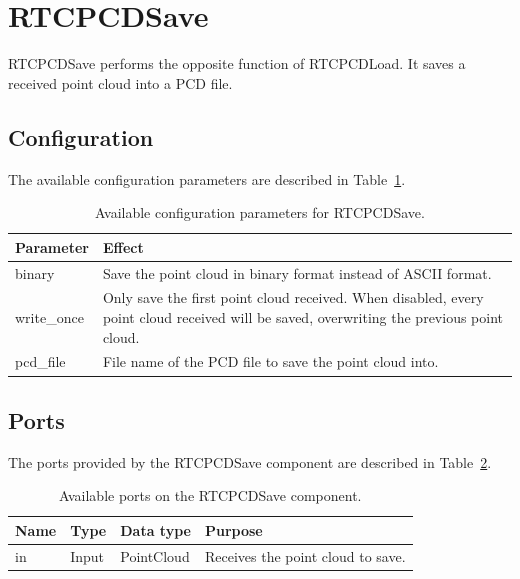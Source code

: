 \documentclass[a4paper,10pt]{article}
\begin{document}
\section{RTCPCDSave}
\label{sec:rtcpcdsave}

RTCPCDSave performs the opposite function of RTCPCDLoad. It saves a received
point cloud into a PCD file.

\subsection{Configuration}
\label{sec1:pcdsave_configuration}

The available configuration parameters are described in
Table~\ref{tab:pcdsave_config_params}.

\begin{table}[t]
  \centering
  \begin{tabularx}{\columnwidth}{lX}
    \toprule
    Parameter & Effect \\
    \midrule
    binary & Save the point cloud in binary format instead of ASCII format. \\
    write\_once & Only save the first point cloud received. When disabled, every point cloud received will be saved, overwriting the previous point cloud. \\
    pcd\_file & File name of the PCD file to save the point cloud into. \\
    \bottomrule
  \end{tabularx}
  \caption{Available configuration parameters for RTCPCDSave.}
  \label{tab:pcdsave_config_params}
\end{table}

\subsection{Ports}
\label{sec1:pcdsave_port}

The ports provided by the RTCPCDSave component are described in Table~\ref{tab:pcdsave_ports}.

\begin{table}[t]
  \centering
  \begin{tabularx}{\columnwidth}{lllX}
    \toprule
    Name & Type & Data type & Purpose \\
    \midrule
    in & Input & PointCloud & Receives the point cloud to save. \\
    \bottomrule
  \end{tabularx}
  \caption{Available ports on the RTCPCDSave component.}
  \label{tab:pcdsave_ports}
\end{table}
\end{document}
